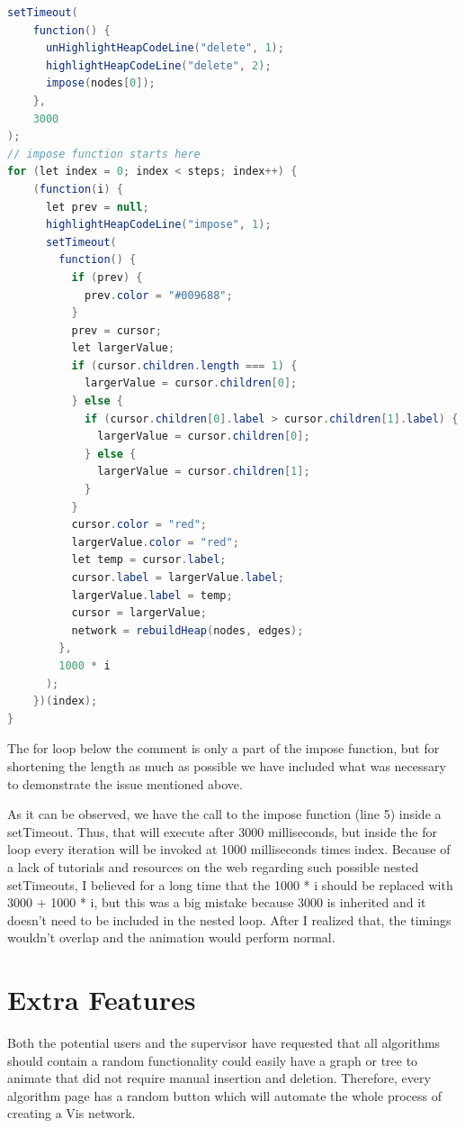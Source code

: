 \documentclass{l4proj}
\begin{document}
\begin{lstlisting}[language=Java, caption=Heap animation that uses nested setTimeouts.]
setTimeout(
    function() {
      unHighlightHeapCodeLine("delete", 1);
      highlightHeapCodeLine("delete", 2);
      impose(nodes[0]);
    },
    3000
);
// impose function starts here
for (let index = 0; index < steps; index++) {
    (function(i) {
      let prev = null;
      highlightHeapCodeLine("impose", 1);
      setTimeout(
        function() {
          if (prev) {
            prev.color = "#009688";
          }
          prev = cursor;
          let largerValue;
          if (cursor.children.length === 1) {
            largerValue = cursor.children[0];
          } else {
            if (cursor.children[0].label > cursor.children[1].label) {
              largerValue = cursor.children[0];
            } else {
              largerValue = cursor.children[1];
            }
          }
          cursor.color = "red";
          largerValue.color = "red";
          let temp = cursor.label;
          cursor.label = largerValue.label;
          largerValue.label = temp;
          cursor = largerValue;
          network = rebuildHeap(nodes, edges);
        },
        1000 * i
      );
    })(index);
}
\end{lstlisting}

The for loop below the comment is only a part of the impose function, but for shortening the length as much as possible
we have included what was necessary to demonstrate the issue mentioned above. 

As it can be observed, we have the call to the impose function (line 5) inside a setTimeout. Thus, that will execute
after 3000 milliseconds, but inside the for loop every iteration will be invoked at 1000 milliseconds times index.
Because of a lack of tutorials and resources on the web regarding such possible nested setTimeouts, I believed for a
long time that the 1000 * i should be replaced with 3000 + 1000 * i, but this was a big mistake because 3000 is
inherited and it doesn't need to be included in the nested loop. After I realized that, the timings wouldn't overlap
and the animation would perform normal.

\section{Extra Features}

Both the potential users and the supervisor have requested that all algorithms should contain a random functionality
could easily have a graph or tree to animate that did not require manual insertion and deletion. Therefore, every
algorithm page has a random button which will automate the whole process of creating a Vis network.
\end{document}
